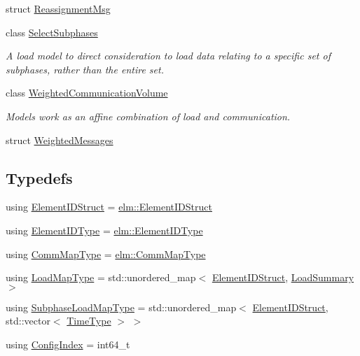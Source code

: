 \begin{DoxyCompactItemize}
\item 
struct \hyperlink{structvt_1_1vrt_1_1collection_1_1balance_1_1_reassignment_msg}{Reassignment\+Msg}
\item 
class \hyperlink{classvt_1_1vrt_1_1collection_1_1balance_1_1_select_subphases}{Select\+Subphases}
\begin{DoxyCompactList}\small\item\em A load model to direct consideration to load data relating to a specific set of subphases, rather than the entire set. \end{DoxyCompactList}\item 
class \hyperlink{classvt_1_1vrt_1_1collection_1_1balance_1_1_weighted_communication_volume}{Weighted\+Communication\+Volume}
\begin{DoxyCompactList}\small\item\em Models work as an affine combination of load and communication. \end{DoxyCompactList}\item 
struct \hyperlink{structvt_1_1vrt_1_1collection_1_1balance_1_1_weighted_messages}{Weighted\+Messages}
\end{DoxyCompactItemize}
\subsection*{Typedefs}
\begin{DoxyCompactItemize}
\item 
using \hyperlink{namespacevt_1_1vrt_1_1collection_1_1balance_a9f5b53fafb270212279a4757d2c4cd28}{Element\+I\+D\+Struct} = \hyperlink{structvt_1_1elm_1_1_element_i_d_struct}{elm\+::\+Element\+I\+D\+Struct}
\item 
using \hyperlink{namespacevt_1_1vrt_1_1collection_1_1balance_a592736f733df4f90856df90a1fd08905}{Element\+I\+D\+Type} = \hyperlink{namespacevt_1_1elm_a63afb64985b41b7b6dcf2f01336391f8}{elm\+::\+Element\+I\+D\+Type}
\item 
using \hyperlink{namespacevt_1_1vrt_1_1collection_1_1balance_a01ee1fb0ae2da1d2ab7fdca3be9ae351}{Comm\+Map\+Type} = \hyperlink{namespacevt_1_1elm_a38487cb8896b9b4763efa9022fab560e}{elm\+::\+Comm\+Map\+Type}
\item 
using \hyperlink{namespacevt_1_1vrt_1_1collection_1_1balance_a5339303db2e1ce964d783a53fd74e6b1}{Load\+Map\+Type} = std\+::unordered\+\_\+map$<$ \hyperlink{namespacevt_1_1vrt_1_1collection_1_1balance_a9f5b53fafb270212279a4757d2c4cd28}{Element\+I\+D\+Struct}, \hyperlink{structvt_1_1vrt_1_1collection_1_1balance_1_1_load_summary}{Load\+Summary} $>$
\item 
using \hyperlink{namespacevt_1_1vrt_1_1collection_1_1balance_a8bdadb2583f128dd256e7d5a10826542}{Subphase\+Load\+Map\+Type} = std\+::unordered\+\_\+map$<$ \hyperlink{namespacevt_1_1vrt_1_1collection_1_1balance_a9f5b53fafb270212279a4757d2c4cd28}{Element\+I\+D\+Struct}, std\+::vector$<$ \hyperlink{namespacevt_a876a9d0cd5a952859c72de8a46881442}{Time\+Type} $>$ $>$
\item 
using \hyperlink{namespacevt_1_1vrt_1_1collection_1_1balance_ac1bb9eee8129549177880dbb4e5f6a34}{Config\+Index} = int64\+\_\+t
\end{DoxyCompactItemize}
